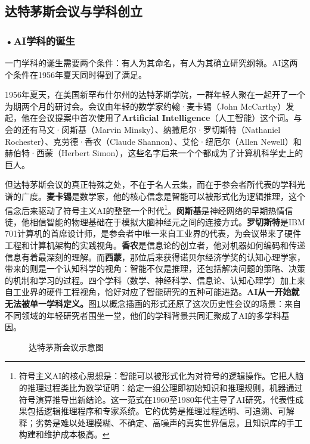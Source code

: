 \subsection{达特茅斯会议与学科创立}

\subsubsection*{\textbf{•AI学科的诞生}}

一门学科的诞生需要两个条件：有人为其命名，有人为其确立研究纲领。AI这两个条件在1956年夏天同时得到了满足。

1956年夏天，在美国新罕布什尔州的达特茅斯学院，一群年轻人聚在一起开了一个为期两个月的研讨会。会议由年轻的数学家约翰·麦卡锡（John McCarthy）发起，他在会议提案中首次使用了\textbf{Artificial Intelligence}（人工智能）这个词。与会的还有马文·闵斯基（Marvin Minsky）、纳撒尼尔·罗切斯特（Nathaniel Rochester）、克劳德·香农（Claude Shannon）、艾伦·纽厄尔（Allen Newell）和赫伯特·西蒙（Herbert Simon），这些名字后来一个个都成为了计算机科学史上的巨人。

但达特茅斯会议的真正特殊之处，不在于名人云集，而在于参会者所代表的学科光谱的广度。\textbf{麦卡锡}是数学家，他的核心信念是智能可以被形式化为逻辑推理，这个信念后来驱动了符号主义AI的整整一个时代\footnote{符号主义AI的核心思想是：智能可以被形式化为对符号的逻辑操作。它把人脑的推理过程类比为数学证明：给定一组公理即初始知识和推理规则，机器通过符号演算推导出新结论。这一范式在1960至1980年代主导了AI研究，代表性成果包括逻辑推理程序和专家系统。它的优势是推理过程透明、可追溯、可解释；劣势是难以处理模糊、不确定、高噪声的真实世界信息，且知识库的手工构建和维护成本极高。}。\textbf{闵斯基}是神经网络的早期热情信徒，他相信智能的物理基础在于模拟大脑神经元之间的连接方式。\textbf{罗切斯特}是IBM 701计算机的首席设计师，是参会者中唯一来自工业界的代表，为会议带来了硬件工程和计算机架构的实践视角。\textbf{香农}是信息论的创立者，他对机器如何编码和传递信息有着最深刻的理解。而\textbf{西蒙}，那位后来获得诺贝尔经济学奖的认知心理学家，带来的则是一个认知科学的视角：智能不仅是推理，还包括解决问题的策略、决策的机制和学习的过程。四个学科（数学、神经科学、信息论、认知心理学）加上来自工业界的硬件工程视角，恰好对应了智能研究的五种可能进路。\textbf{AI从一开始就无法被单一学科定义。}图\ref{fig:ch1_06}以概念插画的形式还原了这次历史性会议的场景：来自不同领域的年轻研究者围坐一堂，他们的学科背景共同汇聚成了AI的多学科基因。

\begin{figure}[htbp]
\centering
{}
\caption{达特茅斯会议示意图}
\label{fig:ch1_06}
\end{figure}

